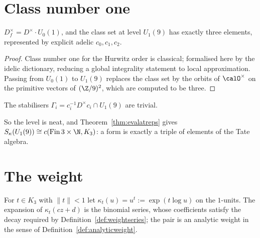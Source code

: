 \section{Class number one}

\begin{theorem}
  \label{thm:jacobs-classset}
  \leanok
  $D_f^\times = D^\times \cdot U_0(1)$, and the class set at level $U_1(9)$ has exactly three
  elements, represented by explicit adelic $c_0, c_1, c_2$.
\end{theorem}

\begin{proof}
  \leanok
  Class number one for the Hurwitz order is classical; formalised here by the idelic dictionary,
  reducing a global integrality statement to local approximation.  Passing from $U_0(1)$ to
  $U_1(9)$ replaces the class set by the orbits of $\calO^\times$ on the primitive vectors of
  $(\Z/9)^2$, which are computed to be three.
\end{proof}

\begin{lemma}
  \label{lem:jacobs-neat}
  \leanok
  The stabilisers $\Gamma_i = c_i^{-1}D^\times c_i \cap U_1(9)$ are trivial.
\end{lemma}

So the level is neat, and Theorem~\ref{thm:evalatreps} gives $S_\kappa(U_1(9)) \cong c(\mathrm{Fin}\,3
\times \N, K_3)$: a form is exactly a triple of elements of the Tate algebra.

\section{The weight}

\begin{definition}
  \label{def:jacobs-weight}
  \leanok
  For $t \in K_3$ with $\lVert t \rVert < 1$ let $\kappa_t(u) = u^t := \exp(t \log u)$ on the
  $1$-units.  The expansion of $\kappa_t(cz+d)$ is the binomial series, whose coefficients
  satisfy the decay required by Definition~\ref{def:weightseries}; the pair is an analytic weight
  in the sense of Definition~\ref{def:analyticweight}.
\end{definition}

